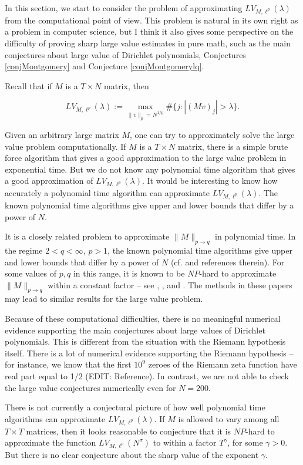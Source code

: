 \documentclass{amsart}
\begin{document}
In this section, we start to consider the problem of approximating $LV_{M, \ell^p}(\lambda)$ from the computational point of view.   This problem is natural in its own right as a problem in computer science, but I think it also gives some perspective on the difficulty of proving sharp large value estimates in pure math, such as the main conjectures about large value of Dirichlet polynomials, Conjectures \ref{conjMontgomery} and Conjecture \ref{conjMontgomerylq}.  

Recall that if $M$ is a $T \times N$ matrix, then

$$ LV_{M,  \ell^p}(\lambda) := \max_{\| v \|_p = N^{1/p}} \# \{ j : | (Mv)_j | > \lambda \}. $$

Given an arbitrary large matrix $M$,  one can try to approximately solve the large value problem computationally.    If $M$ is a $T \times N$ matrix,  there is a simple brute force algorithm that gives a good approximation to the large value problem in exponential time.    But we do not know any polynomial time algorithm that gives a good approximation of $LV_{M,  \ell^p}(\lambda)$.   It would be interesting to know how accurately a polynomial time algorithm can approximate $LV_{M, \ell^p}(\lambda)$.   The known polynomial time algorithms give upper and lower bounds that differ by a power of $N$.  

It is a closely related problem to approximate $\| M \|_{p \rightarrow q}$ in polynomial time.   In the regime $2 < q < \infty$,  $p > 1$,  the known polynomial time algorithms give upper and lower bounds that differ by a power of $N$ (cf. \cite{GMU} and references therein).   For some values of $p,q$ in this range,  it is known to be $NP$-hard to approximate $\| M \|_{p \rightarrow q}$ within a constant factor -- see \cite{BV},  \cite{BBHKSZ},  and \cite{BGGLT}.    The methods in these papers may lead to similar results for the large value problem.

Because of these computational difficulties,  
there is no meaningful numerical evidence supporting the main conjectures about large values of Dirichlet polynomials.   This is different from the situation with the Riemann hypothesis itself.  There is a lot of numerical evidence supporting the Riemann hypothesis -- for instance, we know that the first $10^{9}$ zeroes of the Riemann zeta function have real part equal to 1/2 (EDIT: Reference).  In contrast, we are not able to check the large value conjectures numerically even for $N = 200$.

There is not currently a conjectural picture of how well polynomial time algorithms can approximate $LV_{M, \ell^p}(\lambda)$.  If $M$ is allowed to vary among all $T \times T$ matrices,  then it looks reasonable to conjecture that it is $NP$-hard to approximate the function $LV_{M, \ell^p}(N^\sigma)$ to within a factor $T^{\gamma}$, for some $\gamma  > 0$.  But there is no clear conjecture about the sharp value of the exponent $\gamma$.
\end{document}
